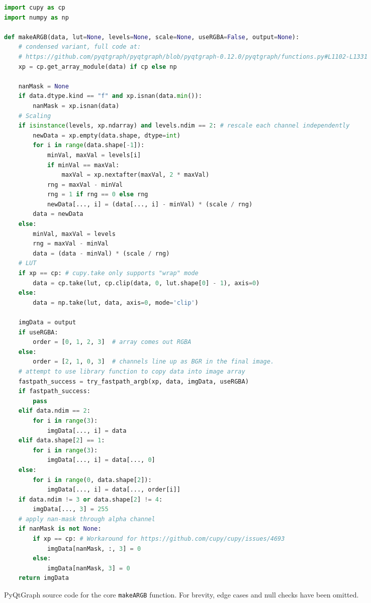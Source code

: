\begin{table}[!tbh]
\begin{lstlisting}[language=python]
import cupy as cp
import numpy as np

def makeARGB(data, lut=None, levels=None, scale=None, useRGBA=False, output=None):
    # condensed variant, full code at:
    # https://github.com/pyqtgraph/pyqtgraph/blob/pyqtgraph-0.12.0/pyqtgraph/functions.py#L1102-L1331
    xp = cp.get_array_module(data) if cp else np

    nanMask = None
    if data.dtype.kind == "f" and xp.isnan(data.min()):
        nanMask = xp.isnan(data)
    # Scaling
    if isinstance(levels, xp.ndarray) and levels.ndim == 2: # rescale each channel independently
        newData = xp.empty(data.shape, dtype=int)
        for i in range(data.shape[-1]):
            minVal, maxVal = levels[i]
            if minVal == maxVal:
                maxVal = xp.nextafter(maxVal, 2 * maxVal)
            rng = maxVal - minVal
            rng = 1 if rng == 0 else rng
            newData[..., i] = (data[..., i] - minVal) * (scale / rng)
        data = newData
    else:
        minVal, maxVal = levels
        rng = maxVal - minVal
        data = (data - minVal) * (scale / rng)
    # LUT
    if xp == cp: # cupy.take only supports "wrap" mode
        data = cp.take(lut, cp.clip(data, 0, lut.shape[0] - 1), axis=0)
    else:
        data = np.take(lut, data, axis=0, mode='clip')

    imgData = output
    if useRGBA:
        order = [0, 1, 2, 3]  # array comes out RGBA
    else:
        order = [2, 1, 0, 3]  # channels line up as BGR in the final image.
    # attempt to use library function to copy data into image array
    fastpath_success = try_fastpath_argb(xp, data, imgData, useRGBA)
    if fastpath_success:
        pass
    elif data.ndim == 2:
        for i in range(3):
            imgData[..., i] = data
    elif data.shape[2] == 1:
        for i in range(3):
            imgData[..., i] = data[..., 0]
    else:
        for i in range(0, data.shape[2]):
            imgData[..., i] = data[..., order[i]]
    if data.ndim != 3 or data.shape[2] != 4:
        imgData[..., 3] = 255
    # apply nan-mask through alpha channel
    if nanMask is not None:
        if xp == cp: # Workaround for https://github.com/cupy/cupy/issues/4693
            imgData[nanMask, :, 3] = 0
        else:
            imgData[nanMask, 3] = 0
    return imgData
\end{lstlisting}
\caption{PyQtGraph source code for the core \texttt{makeARGB} function. For brevity, edge cases and null checks have been omitted.}
\label{table:makeARGB}
\end{table}

